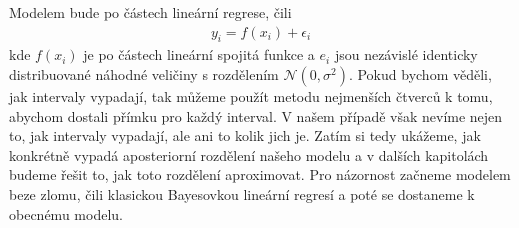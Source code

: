 \documentclass[czech,master,public,dept470,male,cpdeclaration,oneside, python]{diploma}
\begin{document}
Modelem bude po částech lineární regrese, čili
\begin{align}
	y_i = f(x_i) + \epsilon_i
\end{align}
kde $f(x_i)$ je po částech lineární spojitá funkce a $e_i$ jsou nezávislé identicky distribuované náhodné veličiny s rozdělením $\mathcal{N}(0, \sigma^2)$. Pokud bychom věděli, jak intervaly vypadají, tak můžeme použít metodu nejmenších čtverců k tomu, abychom dostali přímku pro každý interval. V našem případě však nevíme nejen to, jak intervaly vypadají, ale ani to kolik jich je. Zatím si tedy ukážeme, jak konkrétně vypadá aposteriorní rozdělení našeho modelu a v dalších kapitolách budeme řešit to, jak toto rozdělení aproximovat. Pro názornost začneme modelem beze zlomu, čili klasickou Bayesovkou lineární regresí a poté se dostaneme k obecnému modelu. 
\end{document}
